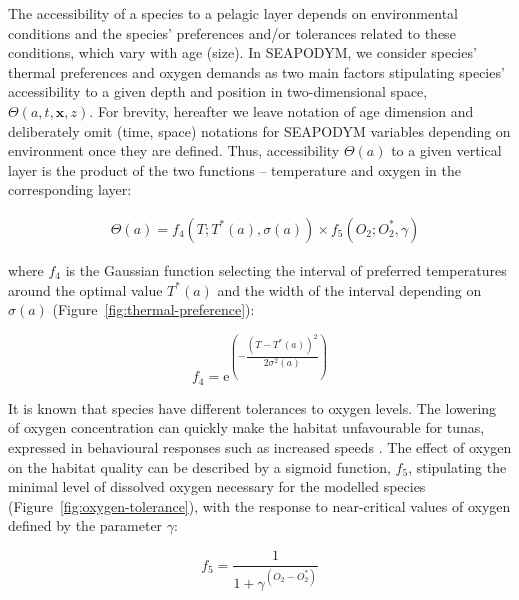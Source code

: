 The accessibility of a species to a pelagic layer depends on environmental conditions and the species' preferences and/or tolerances related to these conditions, which vary with age (size). In SEAPODYM, we consider species' thermal preferences and oxygen demands as two main factors stipulating species' accessibility to a given depth and position in two-dimensional space, $\Theta(a,t,\mathbf{x},z)$. For brevity, hereafter we leave notation of age dimension and deliberately omit (time, space) notations for SEAPODYM variables depending on environment once they are defined. Thus, accessibility $\Theta(a)$ to a given vertical layer is the product of the two functions -- temperature and oxygen in the corresponding layer:

\begin{align}
&\Theta(a) = f_4(T;{T}^{*}(a),\sigma(a)) \times f_5(O_2;O_2^{*},\gamma)
\label{eq:accessibility}
\end{align}

\noindent where $f_4$ is the Gaussian function selecting the interval of preferred temperatures around the optimal value ${T}^{*}(a)$ and the width of the interval depending on $\sigma(a)$ (Figure~\ref{fig:thermal-preference}):

\begin{equation}
  \label{eq:feeding-thermal}
  f_4 = \mathrm{e}^{\left(-\dfrac{( T - {T}^{*}(a))^2}{2 \sigma^2(a)}\right)}
\end{equation}

\noindent It is known that species have different tolerances to oxygen levels. The lowering of oxygen concentration can quickly make the habitat unfavourable for tunas, expressed in behavioural responses such as increased speeds \citep*[see, e.g.][]{Brill}. The effect of oxygen on the habitat quality can be described by a sigmoid function, $f_5$, stipulating the minimal level of dissolved oxygen necessary for the modelled species (Figure~\ref{fig:oxygen-tolerance}), with the response to near-critical values of oxygen defined by the parameter $\gamma$:

\begin{equation}
  \label{eq:oxygen}
  f_5=\frac{1}{1+\gamma^{(O_2-O_2^{*})}}
\end{equation}


